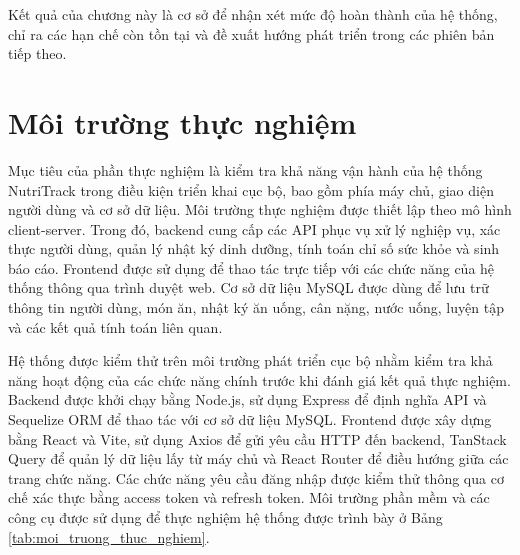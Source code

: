 \documentclass[12pt, a4paper]{report}
\begin{document}
Kết quả của chương này là cơ sở để nhận xét mức độ hoàn thành của hệ thống, chỉ ra các hạn chế còn tồn tại và đề xuất hướng phát triển trong các phiên bản tiếp theo.

\section{Môi trường thực nghiệm}Mục tiêu của phần thực nghiệm là kiểm tra khả năng vận hành của hệ thống NutriTrack trong điều kiện triển khai cục bộ, bao gồm phía máy chủ, giao diện người dùng và cơ sở dữ liệu. Môi trường thực nghiệm được thiết lập theo mô hình client-server. Trong đó, backend cung cấp các API phục vụ xử lý nghiệp vụ, xác thực người dùng, quản lý nhật ký dinh dưỡng, tính toán chỉ số sức khỏe và sinh báo cáo. Frontend được sử dụng để thao tác trực tiếp với các chức năng của hệ thống thông qua trình duyệt web. Cơ sở dữ liệu MySQL được dùng để lưu trữ thông tin người dùng, món ăn, nhật ký ăn uống, cân nặng, nước uống, luyện tập và các kết quả tính toán liên quan.

Hệ thống được kiểm thử trên môi trường phát triển cục bộ nhằm kiểm tra khả năng hoạt động của các chức năng chính trước khi đánh giá kết quả thực nghiệm. Backend được khởi chạy bằng Node.js, sử dụng Express để định nghĩa API và Sequelize ORM để thao tác với cơ sở dữ liệu MySQL. Frontend được xây dựng bằng React và Vite, sử dụng Axios để gửi yêu cầu HTTP đến backend, TanStack Query để quản lý dữ liệu lấy từ máy chủ và React Router để điều hướng giữa các trang chức năng. Các chức năng yêu cầu đăng nhập được kiểm thử thông qua cơ chế xác thực bằng access token và refresh token. Môi trường phần mềm và các công cụ được sử dụng để thực nghiệm hệ thống được trình bày ở Bảng \ref{tab:moi_truong_thuc_nghiem}.
\end{document}
